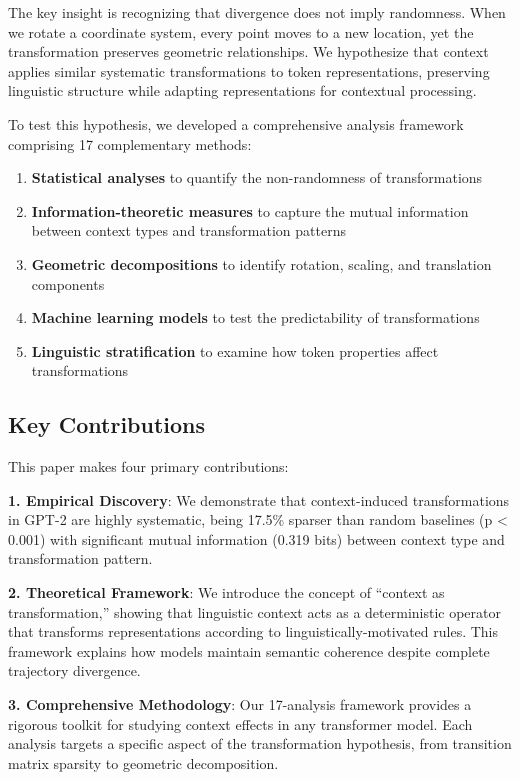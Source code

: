 \documentclass[11pt]{article}
\begin{document}
The key insight is recognizing that divergence does not imply randomness. When we rotate a coordinate system, every point moves to a new location, yet the transformation preserves geometric relationships. We hypothesize that context applies similar systematic transformations to token representations, preserving linguistic structure while adapting representations for contextual processing.

To test this hypothesis, we developed a comprehensive analysis framework comprising 17 complementary methods:

\begin{enumerate}
    \item \textbf{Statistical analyses} to quantify the non-randomness of transformations
    \item \textbf{Information-theoretic measures} to capture the mutual information between context types and transformation patterns
    \item \textbf{Geometric decompositions} to identify rotation, scaling, and translation components
    \item \textbf{Machine learning models} to test the predictability of transformations
    \item \textbf{Linguistic stratification} to examine how token properties affect transformations
\end{enumerate}

\subsection{Key Contributions}

This paper makes four primary contributions:

\textbf{1. Empirical Discovery}: We demonstrate that context-induced transformations in GPT-2 are highly systematic, being 17.5\% sparser than random baselines (p < 0.001) with significant mutual information (0.319 bits) between context type and transformation pattern.

\textbf{2. Theoretical Framework}: We introduce the concept of ``context as transformation,'' showing that linguistic context acts as a deterministic operator that transforms representations according to linguistically-motivated rules. This framework explains how models maintain semantic coherence despite complete trajectory divergence.

\textbf{3. Comprehensive Methodology}: Our 17-analysis framework provides a rigorous toolkit for studying context effects in any transformer model. Each analysis targets a specific aspect of the transformation hypothesis, from transition matrix sparsity to geometric decomposition.
\end{document}
